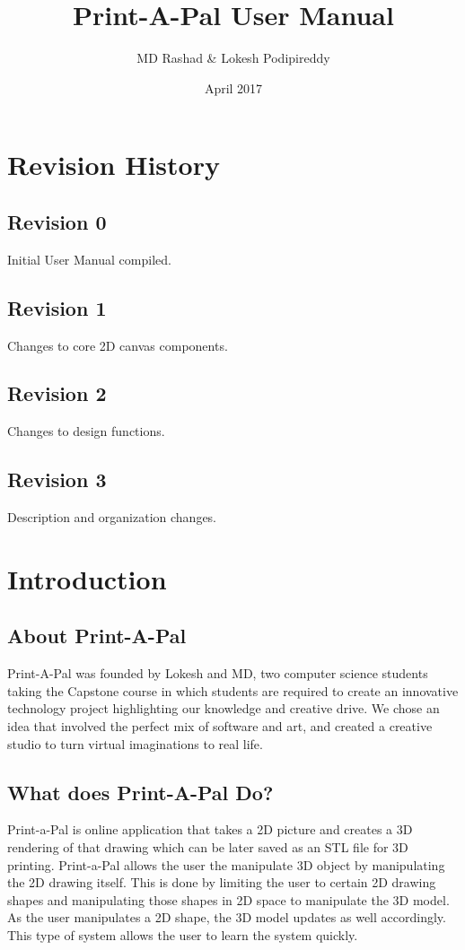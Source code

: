 \documentclass{report}
\title{Print-A-Pal \linebreak User Manual}
\author{MD Rashad \& Lokesh Podipireddy}
\date{\vfill April 2017}
\begin{document}
\maketitle

\tableofcontents

\chapter{Revision History}
\section{Revision 0}
Initial User Manual compiled.
\section{Revision 1} Changes to core 2D canvas components.
\section{Revision 2} Changes to design functions.
\section{Revision 3} Description and organization changes.


\chapter{Introduction}

\section{About Print-A-Pal}
Print-A-Pal was founded by Lokesh and MD, two computer science students taking the Capstone course in which students are required to create an innovative technology project highlighting our knowledge and creative drive.  We chose an idea that involved the perfect mix of software and art, and created a creative studio to turn virtual imaginations to real life.  
 
\section{What does Print-A-Pal Do?}

Print-a-Pal is online application that takes a 2D picture and creates a 3D rendering of that drawing which can be later saved as an STL file for 3D printing. Print-a-Pal allows the user the manipulate 3D object by manipulating the 2D drawing itself. This is done by limiting the user to certain 2D drawing shapes and manipulating those shapes in 2D space to manipulate the 3D model. As the user manipulates a 2D shape, the 3D model updates as well accordingly. This type of system allows the user to learn the system quickly.
\end{document}
